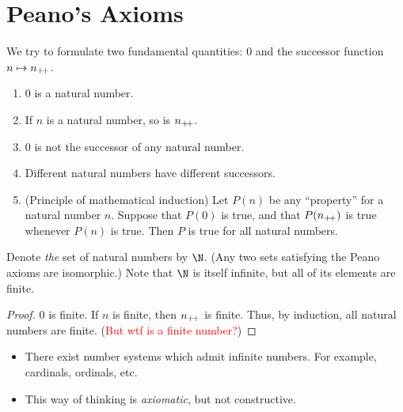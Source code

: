 \section{Peano's Axioms} \label{sec:peano}
We try to formulate two fundamental quantities: $0$ and the successor function
$n \mapsto n_{+\!+}$.
\begin{enumerate}[label=(P\arabic*)]
    \item $0$ is a natural number. \label{peano:0}
    \item If $n$ is a natural number, so is $n_{+\!+}$. \label{peano:closure}
    \item $0$ is not the successor of any natural number.
    \label{peano:no_predecessor}
    \item Different natural numbers have different successors.
    \label{peano:injection}
    \item (Principle of mathematical induction) Let $P(n)$ be any ``property''
    for a natural number $n$.
    Suppose that $P(0)$ is true, and that $P(n_{+\!+})$ is true whenever $P(n)$ is
    true.
    Then $P$ is true for all natural numbers.
    \label{peano:induction}
\end{enumerate}
Denote \emph{the} set of natural numbers by $\N$.
(Any two sets satisfying the Peano axioms are isomorphic.)
Note that $\N$ is itself infinite, but all of its elements are finite.
\begin{proof}
    $0$ is finite.
    If $n$ is finite, then $n_{+\!+}$ is finite.
    Thus, by induction, all natural numbers are finite.
    (\textcolor{Red}{But wtf is a finite number?})
\end{proof}
\begin{remark} \leavevmode
    \begin{itemize}
        \item There exist number systems which admit infinite numbers.
        For example, cardinals, ordinals, etc.
        \item This way of thinking is \textit{axiomatic}, but not constructive.
    \end{itemize}
\end{remark}
